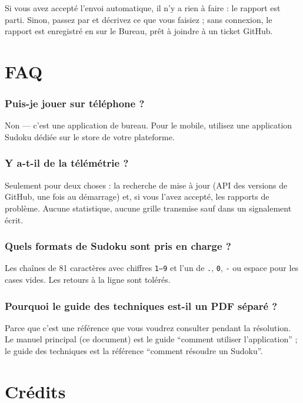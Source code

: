 Si vous avez accepté l'envoi automatique, il n'y a rien à faire : le rapport
est parti. Sinon, passez par  et
décrivez ce que vous faisiez ; sans connexion, le rapport est enregistré en
 sur le Bureau, prêt à joindre à un ticket GitHub.

\section{FAQ}

\subsubsection*{Puis-je jouer sur téléphone ?}
Non --- c'est une application de bureau. Pour le mobile, utilisez une
application Sudoku dédiée sur le store de votre plateforme.

\subsubsection*{Y a-t-il de la télémétrie ?}
Seulement pour deux choses : la recherche de mise à jour (API des versions
de GitHub, une fois au démarrage) et, si vous l'avez accepté, les rapports de
problème. Aucune statistique, aucune grille transmise sauf dans un
signalement écrit.

\subsubsection*{Quels formats de Sudoku sont pris en charge ?}
Les chaînes de 81 caractères avec chiffres \texttt{1--9} et l'un de
\texttt{.}, \texttt{0}, \texttt{-} ou espace pour les cases vides. Les
retours à la ligne sont tolérés.

\subsubsection*{Pourquoi le guide des techniques est-il un PDF séparé ?}
Parce que c'est une référence que vous voudrez consulter pendant la
résolution. Le manuel principal (ce document) est le guide
``comment utiliser l'application'' ; le guide des techniques est la
référence ``comment résoudre un Sudoku''.

\section{Crédits}

